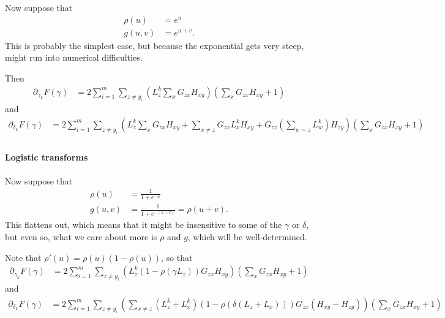 \documentclass{article}
\begin{document}
Now suppose that
\begin{align}
  \rho(u) &= e^{u} \\
  g(u,v) &= e^{u+v} .
\end{align}
This is probably the simplest case, but because the exponential gets very steep,
might run into numerical difficulties.

Then
\begin{align}
  \partial_{\gamma_k} F(\gamma) &= 
    2 \sum_{i=1}^m \sum_{z \neq y_i} 
    \left( L^k_z \sum_x G_{zx} H_{xy}\right) 
    \left( \sum_x G_{zx} H_{xy} + 1 \right)  
\end{align}
and
\begin{align}
  \partial_{\delta_k} F(\gamma) &= 
    2 \sum_{i=1}^m \sum_{z \neq y_i} 
    \left( L^k_z \sum_x G_{zx} H_{xy}
      + \sum_{x \neq z} G_{zx} L^k_x H_{xy}
      + G_{zz} ( \sum_{w \sim z} L^k_w )  H_{zy}
    \right) 
    \left( \sum_x G_{zx} H_{xy} + 1 \right)  \\
\end{align}


\paragraph{Logistic transforms}

Now suppose that
\begin{align}
  \rho(u) &= \frac{1}{1+e^{-u}}  \\
  g(u,v) &= \frac{1}{1+e^{-(u+v)}} = \rho(u+v) .
\end{align}
This flattens out, which means that it might be insensitive to some of the $\gamma$ or $\delta$,
but even so, what we care about more is $\rho$ and $g$, which will be well-determined.

Note that $\rho'(u) = \rho(u) (1-\rho(u))$,
so that
\begin{align}
  \partial_{\gamma_k} F(\gamma) &= 2 \sum_{i=1}^m \sum_{z \neq y_i} \left( L^k_z (1-\rho(\gamma L_z)) G_{zx} H_{xy}\right) \left( \sum_x G_{zx} H_{xy} + 1 \right)  
\end{align}
and
\begin{align}
  \partial_{\delta_k} F(\gamma) &= 2 \sum_{i=1}^m \sum_{z \neq y_i} \left( \sum_{x \neq z} (L^k_z + L^k_x) (1-\rho(\delta(L_z+L_x))) G_{zx} (H_{xy}-H_{zy}) \right) \left( \sum_x G_{zx} H_{xy} + 1 \right)  \\
\end{align}
\end{document}
